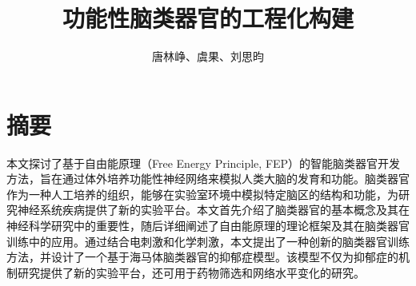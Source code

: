 \confidential{}%
\title{功能性脑类器官的工程化构建}%
\author{唐林峥、虞果、刘思昀}%
\advisorsec{}%
\maketitle%
\makeenglishtitle%

\chapter*{摘\quad 要}%
\setcounter{page}{1}%

本文探讨了基于自由能原理（Free Energy Principle, FEP）的智能脑类器官开发方法，旨在通过体外培养功能性神经网络来模拟人类大脑的发育和功能。脑类器官作为一种人工培养的组织，能够在实验室环境中模拟特定脑区的结构和功能，为研究神经系统疾病提供了新的实验平台。本文首先介绍了脑类器官的基本概念及其在神经科学研究中的重要性，随后详细阐述了自由能原理的理论框架及其在脑类器官训练中的应用。通过结合电刺激和化学刺激，本文提出了一种创新的脑类器官训练方法，并设计了一个基于海马体脑类器官的抑郁症模型。该模型不仅为抑郁症的机制研究提供了新的实验平台，还可用于药物筛选和网络水平变化的研究。

